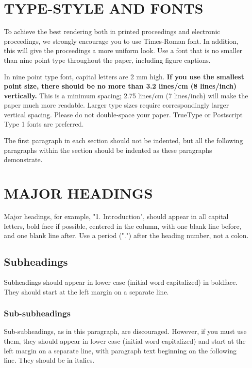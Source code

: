 \documentclass{article}
\begin{document}
\section{TYPE-STYLE AND FONTS}
\label{sec:typestyle}

To achieve the best rendering both in printed proceedings and electronic proceedings, we
strongly encourage you to use Times-Roman font.  In addition, this will give
the proceedings a more uniform look.  Use a font that is no smaller than nine
point type throughout the paper, including figure captions.

In nine point type font, capital letters are 2 mm high.  {\bf If you use the
smallest point size, there should be no more than 3.2 lines/cm (8 lines/inch)
vertically.}  This is a minimum spacing; 2.75 lines/cm (7 lines/inch) will make
the paper much more readable.  Larger type sizes require correspondingly larger
vertical spacing.  Please do not double-space your paper.  TrueType or
Postscript Type 1 fonts are preferred.

The first paragraph in each section should not be indented, but all the
following paragraphs within the section should be indented as these paragraphs
demonstrate.

\section{MAJOR HEADINGS}
\label{sec:majhead}

Major headings, for example, "1. Introduction", should appear in all capital
letters, bold face if possible, centered in the column, with one blank line
before, and one blank line after. Use a period (".") after the heading number,
not a colon.

\subsection{Subheadings}
\label{ssec:subhead}

Subheadings should appear in lower case (initial word capitalized) in
boldface.  They should start at the left margin on a separate line.
 
\subsubsection{Sub-subheadings}
\label{sssec:subsubhead}

Sub-subheadings, as in this paragraph, are discouraged. However, if you
must use them, they should appear in lower case (initial word
capitalized) and start at the left margin on a separate line, with paragraph
text beginning on the following line.  They should be in italics.
\end{document}
